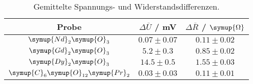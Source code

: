 \begin{table}[!htp]
\centering
\caption{Gemittelte Spannungs- und Widerstandsdifferenzen.}
\label{tab:mittel}
\begin{tabular}{c c c}
\toprule
{Probe} & {$\Delta \overline{U}$ / mV} & {$\Delta \overline{R}$ / $\symup{\Omega}$} \\
\midrule
$\symup{Nd}_2\symup{O}_3$               & $0.07 \pm 0.07$ & $ 0.11 \pm 0.02 $ \\
$\symup{Gd}_2\symup{O}_3$               & $5.2 \pm 0.3  $ & $ 0.85 \pm 0.02$ \\
$\symup{Dy}_2\symup{O}_3$               & $14.5 \pm 0.5 $ & $ 1.55 \pm 0.03 $\\
$\symup{C}_6\symup{O}_{12}\symup{Pr}_2$ & $0.03\pm 0.03 $ & $ 0.11 \pm 0.01$\\
\bottomrule
\end{tabular}
\end{table}